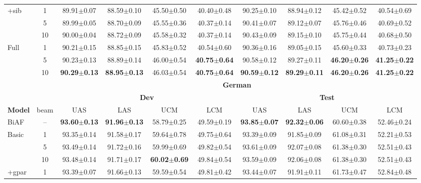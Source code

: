 \documentclass[11pt,a4paper]{article}
\begin{document}
\begin{table*}[h]
{\begin{tabular}[t]{l|c|cccc|cccc}
\hline
\multirow{3}{*}{\textsf{+sib}}& 1 & 89.91$\pm$0.07 & 88.59$\pm$0.10 & 45.50$\pm$0.50 & 40.40$\pm$0.48 & 90.25$\pm$0.10 & 88.94$\pm$0.12 & 45.42$\pm$0.52 & 40.54$\pm$0.69 \\
& 5 & 89.99$\pm$0.05 & 88.70$\pm$0.09 & 45.55$\pm$0.36 & 40.37$\pm$0.14 & 90.41$\pm$0.07 & 89.12$\pm$0.07 & 45.76$\pm$0.46 & 40.69$\pm$0.52 \\
& 10 & 90.00$\pm$0.04 & 88.72$\pm$0.09 & 45.58$\pm$0.32 & 40.37$\pm$0.14 & 90.43$\pm$0.09 & 89.15$\pm$0.10 & 45.75$\pm$0.44 & 40.68$\pm$0.50 \\
\hline
\multirow{3}{*}{\textsf{Full}} & 1 & 90.21$\pm$0.15 & 88.85$\pm$0.15 & 45.83$\pm$0.52 & 40.54$\pm$0.60 & 90.36$\pm$0.16 & 89.05$\pm$0.15 & 45.60$\pm$0.33 & 40.73$\pm$0.23 \\
& 5 & 90.23$\pm$0.13 & 88.89$\pm$0.14 & 46.00$\pm$0.54 & \textbf{40.75$\pm$0.64} & 90.58$\pm$0.12 & 89.27$\pm$0.11 & \textbf{46.20$\pm$0.26} & \textbf{41.25$\pm$0.22} \\
& 10 & \textbf{90.29$\pm$0.13} & \textbf{88.95$\pm$0.13} & 46.03$\pm$0.54 & \textbf{40.75$\pm$0.64} & \textbf{90.59$\pm$0.12} & \textbf{89.29$\pm$0.11} & \textbf{46.20$\pm$0.26} & \textbf{41.25$\pm$0.22} \\
\hline
& & \multicolumn{8}{c}{\textbf{German}} \\
\cline{3-10}
& & \multicolumn{4}{c|}{\textbf{Dev}} & \multicolumn{4}{c}{\textbf{Test}} \\
\cline{3-10}
\textbf{Model} & beam & UAS & LAS & UCM & LCM & UAS & LAS & UCM & LCM \\
\hline
BiAF & -- & \textbf{93.60$\pm$0.13} & \textbf{91.96$\pm$0.13} & 58.79$\pm$0.25 & 49.59$\pm$0.19 & \textbf{93.85$\pm$0.07} & \textbf{92.32$\pm$0.06} & 60.60$\pm$0.38 & 52.46$\pm$0.24 \\
\hline
\hline
\multirow{3}{*}{\textsf{Basic}} & 1 & 93.35$\pm$0.14 & 91.58$\pm$0.17 & 59.64$\pm$0.78 & 49.75$\pm$0.64 & 93.39$\pm$0.09 & 91.85$\pm$0.09 & 61.08$\pm$0.31 & 52.21$\pm$0.53 \\
& 5 & 93.49$\pm$0.14 & 91.72$\pm$0.16 & 59.99$\pm$0.69 & 49.82$\pm$0.54 & 93.61$\pm$0.09 & 92.07$\pm$0.08 & 61.38$\pm$0.30 & 52.51$\pm$0.43 \\
& 10 & 93.48$\pm$0.14 & 91.71$\pm$0.17 & \textbf{60.02$\pm$0.69} & 49.84$\pm$0.54 & 93.59$\pm$0.09 & 92.06$\pm$0.08 & 61.38$\pm$0.30 & 52.51$\pm$0.43 \\
\hline
\multirow{3}{*}{\textsf{+gpar}} & 1 & 93.39$\pm$0.07 & 91.66$\pm$0.13 & 59.59$\pm$0.54 & 49.81$\pm$0.42 & 93.44$\pm$0.07 & 91.91$\pm$0.11 & 61.73$\pm$0.47 & 52.84$\pm$0.48 \\

\end{tabular}}
\end{table*}
\end{document}
